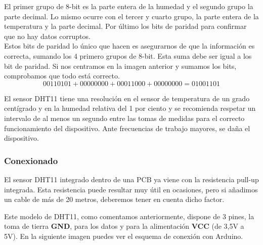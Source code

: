 El primer grupo de 8-bit es la parte entera de la humedad y el segundo grupo la parte decimal. Lo mismo ocurre con el tercer y cuarto grupo, la parte entera de la temperatura 
y la parte decimal. Por último los bits de paridad para confirmar que no hay datos corruptos.\\

Estos bits de paridad lo único que hacen es asegurarnos de que la información es correcta, sumando los 4 primero grupos de 8-bit. Esta suma debe ser igual a los bit de
paridad. Si nos centramos en la imagen anterior y sumamos los bits, comprobamos que todo está correcto.\\

\begin{equation}
0011 0101 + 0000 0000 + 0001 1000 + 0000 0000 = 0100 1101
\end{equation}

El sensor DHT11 tiene una resolución en el sensor de temperatura de un grado centígrado y en la
humedad relativa del 1 por ciento y se recomienda respetar un intervalo de al menos un segundo entre las
tomas de medidas para el correcto funcionamiento del dispositivo. Ante frecuencias de trabajo
mayores, se daña el dispositivo.\\

\subsubsection{Conexionado}

El sensor DHT11 integrado dentro de una PCB ya viene con la resistencia pull-up integrada. Esta resistencia puede resultar muy útil en ocasiones, pero si añadimos un cable
de más de 20 metros, deberemos tener en cuenta dicho factor.

Este modelo de DHT11, como comentamos anteriormente, dispone de 3 pines, la toma de tierra \textbf{GND}, para los datos  y para la alimentación \textbf{VCC} 
(de 3,5V a 5V). En la siguiente imagen puedes ver el esquema de conexión con Arduino.

